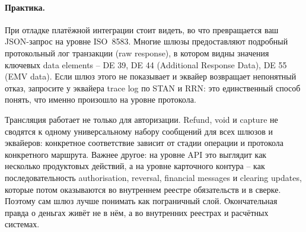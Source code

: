 \paragraph{Практика.}
  При отладке платёжной интеграции стоит видеть, во что
  превращается ваш JSON-запрос на уровне ISO~8583. Многие
  шлюзы предоставляют подробный протокольный лог транзакции
  (raw response), в котором видны значения ключевых data
  elements -- DE 39,
  DE 44 (Additional Response Data), DE 55 (EMV data). Если шлюз
  этого не показывает и эквайер возвращает непонятный отказ,
  запросите у эквайера trace log по STAN и RRN: это единственный
  способ понять, что именно произошло на уровне протокола.


Трансляция работает не только для авторизации. Refund, void
и capture не сводятся к одному универсальному набору сообщений
для всех шлюзов и эквайеров: конкретное соответствие зависит
от стадии операции и протокола конкретного маршрута. Важнее
другое: на уровне API это выглядит как несколько продуктовых
действий, а на уровне карточного контура -- как последовательность
authorisation, reversal, financial messages и clearing updates,
которые потом оказываются во внутреннем реестре обязательств
и в сверке. Поэтому сам шлюз лучше понимать как пограничный
слой. Окончательная правда о деньгах живёт не в нём,
а во внутренних реестрах и расчётных системах.

